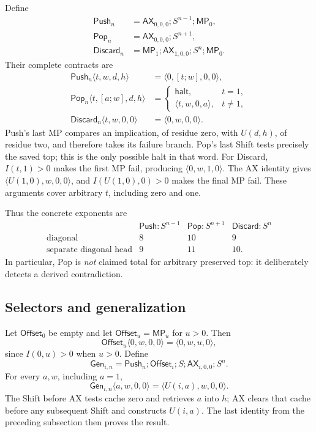 Define
\begin{align*}
 \mathsf{Push}_n&=\mathsf{AX}_{0,0,0};S^{n-1};\mathsf{MP}_0,\\
 \mathsf{Pop}_n&=\mathsf{AX}_{0,0,0};S^{n+1},\\
 \mathsf{Discard}_n&=\mathsf{MP}_1;\mathsf{AX}_{1,0,0};S^n;
                    \mathsf{MP}_0.
\end{align*}
Their complete contracts are
\begin{align*}
 \mathsf{Push}_n\langle t,w,d,h\rangle
   &=\langle0,[t;w],0,0\rangle,\\
 \mathsf{Pop}_n\langle t,[a;w],d,h\rangle
   &=\begin{cases}
       \mathsf{halt},&t=1,\\
       \langle t,w,0,a\rangle,&t\ne1,
     \end{cases}\\
 \mathsf{Discard}_n\langle t,w,0,0\rangle
   &=\langle0,w,0,0\rangle.
\end{align*}
Push's last MP compares an implication, of residue zero, with $U(d,h)$,
of residue two, and therefore takes its failure branch. Pop's last Shift
tests precisely the saved top; this is the only possible halt in that
word. For Discard, $I(t,1)>0$ makes the first MP fail, producing
$\langle0,w,1,0\rangle$. The AX identity gives
$\langle U(1,0),w,0,0\rangle$, and $I(U(1,0),0)>0$ makes the final
MP fail. These arguments cover arbitrary $t$, including zero and one.

Thus the concrete exponents are
\[
\begin{array}{c|ccc}
 &\mathsf{Push}:S^{n-1}&\mathsf{Pop}:S^{n+1}
 &\mathsf{Discard}:S^n\\ \hline
\text{diagonal}&8&10&9\\
\text{separate diagonal head}&9&11&10.
\end{array}
\]
In particular, Pop is \emph{not} claimed total for arbitrary preserved
top: it deliberately detects a derived contradiction.

\subsection{Selectors and generalization}

Let $\mathsf{Offset}_0$ be empty and let
$\mathsf{Offset}_u=\mathsf{MP}_u$ for $u>0$. Then
\[
 \mathsf{Offset}_u\langle0,w,0,0\rangle=\langle0,w,u,0\rangle,
\]
since $I(0,u)>0$ when $u>0$. Define
\[
 \mathsf{Gen}_{i,n}=\mathsf{Push}_n;\mathsf{Offset}_i;S;
                  \mathsf{AX}_{i,0,0};S^n.
\]
For every $a,w$, including $a=1$,
\[
 \mathsf{Gen}_{i,n}\langle a,w,0,0\rangle
       =\langle U(i,a),w,0,0\rangle.
\]
The Shift before AX tests cache zero and retrieves $a$ into $h$; AX
clears that cache before any subsequent Shift and constructs $U(i,a)$.
The last identity from the preceding subsection then proves the result.

